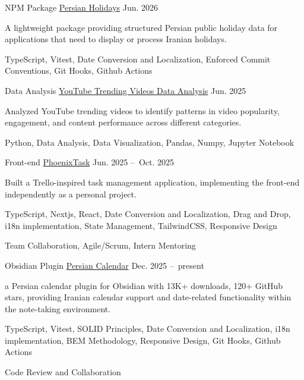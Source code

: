 \begin{cventries}
\cventry
{NPM Package}
{\href{https://www.npmjs.com/package/persian-holidays}{Persian Holidays}}
{}
{Jun. 2026}
{
  \begin{cvitems}
    \item {A lightweight package providing structured Persian public holiday data for applications that need to display or process Iranian holidays.}
    \item {TypeScript, Vitest, Date Conversion and Localization, Enforced Commit Conventions, Git Hooks, Github Actions}
  \end{cvitems}
}

\cventry
{Data Analysis}
{\href{https://github.com/NedaMani/youtube_trending_analysis}{YouTube Trending Videos Data Analysis}}
{}
{Jun. 2025}
{
  \begin{cvitems}
    \item {Analyzed YouTube trending videos to identify patterns in video popularity, engagement, and content performance across different categories.}
    \item {Python, Data Analysis, Data Visualization, Pandas, Numpy, Jupyter Notebook}
  \end{cvitems}
}

\cventry
{Front-end}
{\href{https://github.com/PhoenixTask/WebApp}{PhoenixTask}}
{}
{Jun. 2025 --\ Oct. 2025}
{
  \begin{cvitems}
    \item {Built a Trello-inspired task management application, implementing the front-end independently as a personal project.}
    \item {TypeScript, Nextjs, React, Date Conversion and Localization, Drag and Drop, i18n implementation, State Management, TailwindCSS, Responsive Design}
    \item {Team Collaboration, Agile/Scrum, Intern Mentoring}
  \end{cvitems}
}

\cventry
{Obsidian Plugin}
{\href{https://github.com/karfekr/obsidian-persian-calendar}{Persian Calendar}}
{}
{Dec. 2025 --\ present}
{
  \begin{cvitems}
    \item {a Persian calendar plugin for Obsidian with 13K+ downloads, 120+ GitHub stars, providing Iranian calendar support and date-related functionality within the note-taking environment.}
    \item {TypeScript, Vitest, SOLID Principles, Date Conversion and Localization, i18n implementation, BEM Methodology, Responsive Design, Git Hooks, Github Actions}
    \item {Code Review and Collaboration}
  \end{cvitems}
}


\end{cventries}
